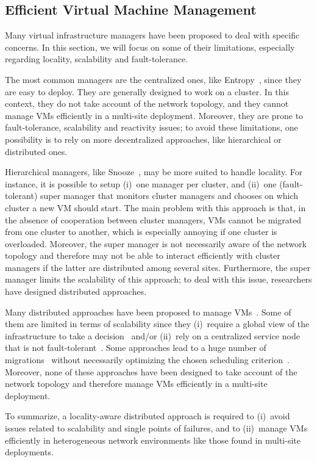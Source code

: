 
\subsection{Efficient Virtual Machine Management}

Many virtual infrastructure managers have been proposed to deal with specific
concerns.
%
In this section, we will focus on some of their limitations, especially
regarding locality, scalability and fault-tolerance.

The most common managers are the centralized ones, like
Entropy~\cite{hermenier:cp11,hermenier:2013}, since they are easy to deploy.
%
They are generally designed to work on a cluster.
%
In this context, they do not take account of the network topology, and they
cannot manage VMs efficiently in a multi-site deployment.
%
Moreover, they are prone to fault-tolerance, scalability and reactivity
issues; to avoid these limitations, one possibility is to rely on more
decentralized approaches, like hierarchical or distributed ones.

Hierarchical managers, like Snooze~\cite{feller:ccgrid12}, may be more suited to
handle locality.
%
For instance, it is possible to setup (i)~one manager per cluster, and (ii)~one
(fault-tolerant) super manager that monitors cluster managers and chooses on
which cluster a new VM should start.
%
%
The main problem with this approach is that, in the absence of cooperation
between cluster managers, VMs cannot be migrated from one cluster to another,
which is especially annoying if one cluster is overloaded.
%
Moreover, the super manager is not necessarily aware of the network topology and
therefore may not be able to interact efficiently with cluster managers if the
latter are distributed among several sites.
%
Furthermore, the super manager limits the scalability of this approach; to deal
with this issue, researchers have designed distributed approaches.

Many distributed approaches have been proposed to manage
VMs~\cite{barbagallo:lncs10,feller:cloudcom12,marzolla:wowmom11,mastroianni:europar11,rouzaudcornabas:vhpc10,yazir:cloud10}.
%
Some of them are limited in terms of scalability since they (i)~require a global
view of the infrastructure to take a
decision~\cite{rouzaudcornabas:vhpc10,yazir:cloud10} and/or (ii)~rely on a
centralized service node that is not
fault-tolerant~\cite{mastroianni:europar11,yazir:cloud10}.
%
Some approaches lead to a huge number of
migrations~\cite{barbagallo:lncs10,mastroianni:europar11} without necessarily
optimizing the chosen scheduling criterion~\cite{barbagallo:lncs10}.
%
Moreover, none of these approaches have been designed to take account of the
network topology and therefore manage VMs efficiently in a multi-site
deployment.

To summarize, a locality-aware distributed approach is required to (i)~avoid
issues related to scalability and single points of failures, and to (ii)~manage
VMs efficiently in heterogeneous network environments like those found in
multi-site deployments.
